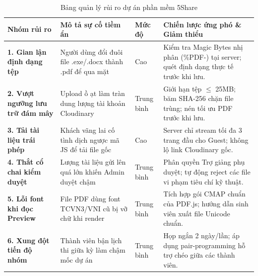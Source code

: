 \begin{table}[htbp]
\centering
\small
\caption{Bảng quản lý rủi ro dự án phần mềm 5Share}
\label{tab:risks}
\begin{tabularx}{\textwidth}{|p{2.8cm}|X|p{1.4cm}|X|}
\hline
\textbf{Nhóm rủi ro} & \textbf{Mô tả sự cố tiềm ẩn} & \textbf{Mức độ} & \textbf{Chiến lược ứng phó \& Giảm thiểu} \\
\hline
\textbf{1. Gian lận định dạng tệp} & Người dùng đổi đuôi file .exe/.docx thành .pdf để qua mặt & Cao & Kiểm tra Magic Bytes nhị phân (\%PDF-) tại server; quét định dạng thực tế trước khi lưu. \\
\hline
\textbf{2. Vượt ngưỡng lưu trữ đám mây} & Upload ồ ạt làm tràn dung lượng tài khoản Cloudinary & Trung bình & Giới hạn tệp $\le$ 25MB; băm SHA-256 chặn file trùng; nén tối ưu PDF trước khi lưu. \\
\hline
\textbf{3. Tải tài liệu trái phép} & Khách vãng lai cố tình dịch ngược mã JS để tải file gốc & Cao & Server chỉ stream tối đa 3 trang đầu cho Guest; không lộ link Cloudinary gốc. \\
\hline
\textbf{4. Thắt cổ chai kiểm duyệt} & Lượng tài liệu gửi lên quá lớn khiến Admin duyệt chậm & Trung bình & Phân quyền Trợ giảng phụ duyệt; tự động reject các file vi phạm tiêu chí kỹ thuật. \\
\hline
\textbf{5. Lỗi font khi đọc Preview} & File PDF dùng font TCVN3/VNI cũ bị vỡ chữ khi render & Trung bình & Tích hợp gói CMAP chuẩn của PDF.js; hướng dẫn sinh viên xuất file Unicode chuẩn. \\
\hline
\textbf{6. Xung đột tiến độ nhóm} & Thành viên bận lịch thi giữa kỳ làm chậm mốc dự án & Trung bình & Họp ngắn 2 ngày/lần; áp dụng pair-programming hỗ trợ chéo giữa các thành viên. \\
\hline
\end{tabularx}
\end{table}
